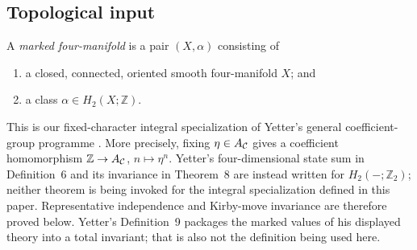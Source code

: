 \subsection{Topological input}
\label{subsec:topological-input}

\begin{definition}
\label{def:marked-four-manifold}
A \emph{marked four-manifold} is a pair $(X,\alpha)$ consisting of
\begin{enumerate}[label=(\roman*),ref=\roman*]
  \item\label{item:marked-manifold}
  a closed, connected, oriented smooth four-manifold $X$; and
  \item\label{item:manifold-marking}
  a class $\alpha\in H_2(X;\mathbb Z)$.
\end{enumerate}
This is our fixed-character integral specialization of Yetter's general
coefficient-group programme \cite[pp.~2--3]{Yetter1993}.  More precisely,
fixing $\eta\in A_{\mathcal{C}}$ gives a coefficient homomorphism
$\mathbb Z\to A_{\mathcal{C}}$, $n\mapsto\eta^n$.  Yetter's four-dimensional state
sum in Definition~6 and its invariance in Theorem~8 are instead written for
$H_2(-;\mathbb Z_2)$; neither theorem is being invoked for the integral
specialization defined in this paper.  Representative independence and
Kirby-move invariance are therefore proved below.  Yetter's Definition~9
packages the marked values of his displayed theory into a total invariant;
that is also not the definition being used here.
\end{definition}


